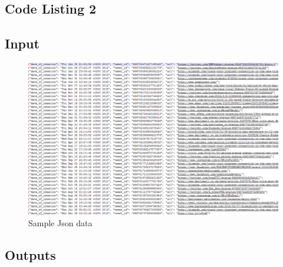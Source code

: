 
\newpage

\subsection{Code Listing 2}


\newpage

\subsection{Input}
\begin{figure}[ht]    
    \begin{center}
        \includegraphics[scale=0.6]{sampleinput3.png}
        \caption{Sample Json data}
        \label{Sampleti1}
    \end{center}
\end{figure}
\newpage


\subsection{Outputs}
